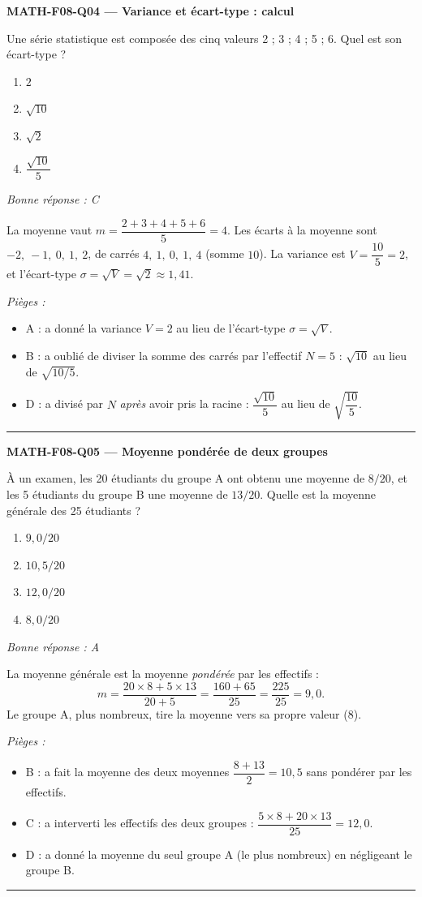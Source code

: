\documentclass[11pt,a4paper]{article}
\begin{document}
\noindent\textbf{MATH-F08-Q04 --- Variance et écart-type : calcul}\par
Une série statistique est composée des cinq valeurs 2 ; 3 ; 4 ; 5 ; 6. Quel est son écart-type ?
\begin{enumerate}[label=\Alph*)]
\item $2$
\item $\sqrt{10}$
\item $\sqrt{2}$
\item $\dfrac{\sqrt{10}}{5}$
\end{enumerate}
\textit{Bonne réponse : C}\par
La moyenne vaut $m=\dfrac{2+3+4+5+6}{5}=4$. Les écarts à la moyenne sont $-2,\ -1,\ 0,\ 1,\ 2$, de carrés $4,\ 1,\ 0,\ 1,\ 4$ (somme $10$). La variance est $V=\dfrac{10}{5}=2$, et l'écart-type $\sigma=\sqrt{V}=\sqrt{2}\approx1{,}41$.\par
\textit{Pièges :}
\begin{itemize}
\item A : a donné la variance $V=2$ au lieu de l'écart-type $\sigma=\sqrt{V}$.
\item B : a oublié de diviser la somme des carrés par l'effectif $N=5$ : $\sqrt{10}$ au lieu de $\sqrt{10/5}$.
\item D : a divisé par $N$ \emph{après} avoir pris la racine : $\dfrac{\sqrt{10}}{5}$ au lieu de $\sqrt{\dfrac{10}{5}}$.
\end{itemize}
\vspace{8pt}\hrule\vspace{8pt}

\noindent\textbf{MATH-F08-Q05 --- Moyenne pondérée de deux groupes}\par
À un examen, les 20 étudiants du groupe A ont obtenu une moyenne de $8/20$, et les 5 étudiants du groupe B une moyenne de $13/20$. Quelle est la moyenne générale des 25 étudiants ?
\begin{enumerate}[label=\Alph*)]
\item $9{,}0/20$
\item $10{,}5/20$
\item $12{,}0/20$
\item $8{,}0/20$
\end{enumerate}
\textit{Bonne réponse : A}\par
La moyenne générale est la moyenne \emph{pondérée} par les effectifs :
\[ m=\dfrac{20\times 8 + 5\times 13}{20+5}=\dfrac{160+65}{25}=\dfrac{225}{25}=9{,}0. \]
Le groupe A, plus nombreux, tire la moyenne vers sa propre valeur ($8$).\par
\textit{Pièges :}
\begin{itemize}
\item B : a fait la moyenne des deux moyennes $\dfrac{8+13}{2}=10{,}5$ sans pondérer par les effectifs.
\item C : a interverti les effectifs des deux groupes : $\dfrac{5\times 8+20\times 13}{25}=12{,}0$.
\item D : a donné la moyenne du seul groupe A (le plus nombreux) en négligeant le groupe B.
\end{itemize}
\vspace{8pt}\hrule\vspace{8pt}
\end{document}
